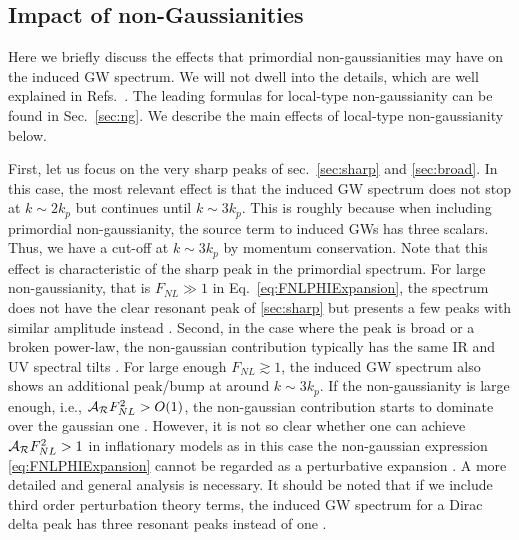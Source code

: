 \documentclass[a4paper,11pt]{article}
\numberwithin{equation}{section}
\begin{document}
\subsection{Impact of non-Gaussianities \label{sec:nongaussian}}

Here we briefly discuss the effects that primordial non-gaussianities may have on the induced GW spectrum. We will not dwell into the details, which are well explained in Refs.~\cite{Cai:2018dig,Unal:2018yaa,Adshead:2021hnm}. The leading formulas for local-type non-gaussianity can be found in Sec.~\ref{sec:ng}. We describe the main effects of local-type non-gaussianity below.

First, let us focus on the very sharp peaks of sec.~\ref{sec:sharp} and \ref{sec:broad}. In this case, the most relevant effect is that the induced GW spectrum does not stop at $k\sim 2k_p$ but continues until $k\sim 3k_p$. This is roughly because when including primordial non-gaussianity, the source term to induced GWs has three scalars. Thus, we have a cut-off at $k\sim 3k_p$ by momentum conservation.  Note that this effect is characteristic of the sharp peak in the primordial spectrum. For large non-gaussianity, that is $F_{NL}\gg1$ in Eq.~\eqref{eq:FNLPHIExpansion}, the spectrum does not have the clear resonant peak of \ref{sec:sharp} but presents a few peaks with similar amplitude instead \cite{Cai:2018dig,Adshead:2021hnm}. Second, in the case where the peak is broad or a broken power-law, the non-gaussian contribution typically has the same IR and UV spectral tilts \cite{Atal:2021jyo,Adshead:2021hnm}. For large enough $F_{NL}\gtrsim 1$, the induced GW spectrum also shows an additional peak/bump at around $k\sim 3k_p$. If the non-gaussianity is large enough, i.e., ${\cal A}_{\cal R}F^2_{NL}>O(1)$, the non-gaussian contribution starts to dominate over the gaussian one \cite{Cai:2018dig,Adshead:2021hnm}. However, it is not so clear whether one can achieve ${\cal A}_{\cal R}F^2_{NL}>1$ in inflationary models as in this case the non-gaussian expression \eqref{eq:FNLPHIExpansion} cannot be regarded as a perturbative expansion \cite{Atal:2021jyo}. A more detailed and general analysis is necessary. It should be noted that if we include third order perturbation theory terms, the induced GW spectrum for a Dirac delta peak has three resonant peaks instead of one \cite{Yuan:2021qgz,Yuan:2019udt}.
\end{document}
